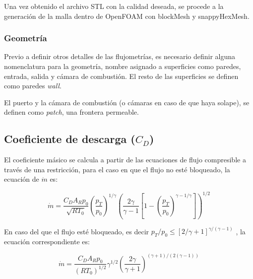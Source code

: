 Una vez obtenido el archivo STL con la calidad deseada, se procede a la
generación de la malla dentro de OpenFOAM con blockMesh y snappyHexMesh.



\subsubsection{Geometría}
%
Previo a definir otros detalles de las flujometrías, es necesario definir
alguna nomenclatura para la geometría, nombre asignado a superficies como
paredes, entrada, salida y cámara de combustión.
%
El resto de las superficies se definen como paredes \emph{wall}.



El puerto y la cámara de combustión (o cámaras en caso de que haya solape), se
definen como \emph{patch}, una frontera permeable.

\subsection{Coeficiente de descarga ($C_D$)}

El coeficiente másico se calcula a partir de las ecuaciones de flujo
compresible a través de una restricción, para el caso en que el flujo no esté
bloqueado, la ecuación de $\dot{m}$ es:

\begin{equation}
    \label{eq:m_not_choked}
    \dot{m} = \frac{C_D A_R p_0}{\sqrt{R T_0}}
            {\left(\frac{p_T}{p_0} \right)}^{1/\gamma}
            {\left( \frac{2\gamma}{\gamma-1} \left[1- {(\frac{p_T}{p_0})}^{{\gamma-1}/\gamma} \right] \right)}^{1/2}
\end{equation}

En caso del que el flujo esté bloqueado, es decir
$p_T/p_0 \le {[2/\gamma+1]}^{\gamma/(\gamma - 1)}$
, la ecuación correspondiente es:

\begin{equation}
  \dot{m}=  \frac {C_D A_R p_0} {{(R T_0)}^{1/2}}
            \gamma^{1/2}
            {\left( \frac{2\gamma}{\gamma+1} \right)}^{(\gamma+1)/(2(\gamma-1))}
\end{equation}

